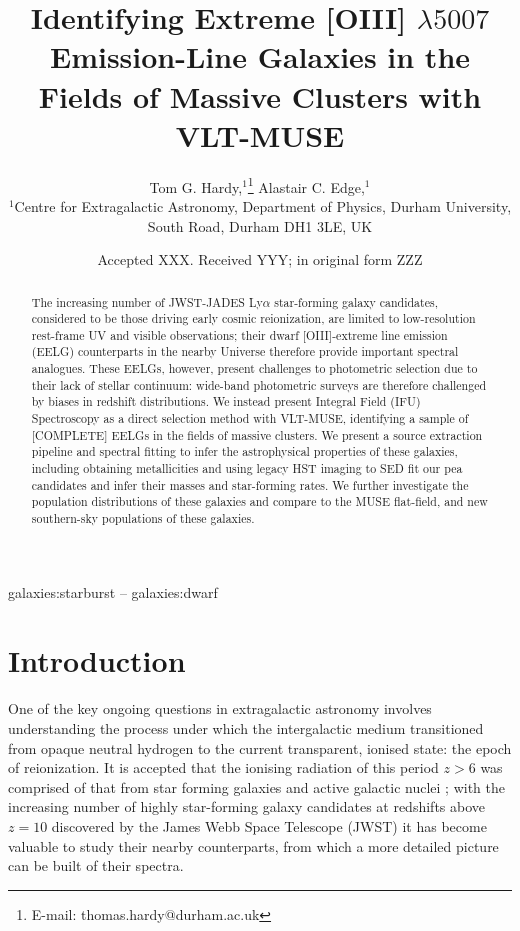 \documentclass[fleqn,usenatbib]{mnras}
\title[Finding EELGS with VLT-MUSE]{Identifying Extreme [OIII] $\lambda5007$ Emission-Line Galaxies in the Fields of Massive Clusters with VLT-MUSE }
\author[T. G. Hardy et. al.]{
Tom G. Hardy,$^{1}$\thanks{E-mail: thomas.hardy@durham.ac.uk}
Alastair C. Edge,$^{1}$
\\
$^{1}$Centre for Extragalactic Astronomy, Department of Physics, Durham University, South Road, Durham DH1 3LE, UK\\
}
\date{Accepted XXX. Received YYY; in original form ZZZ}
\begin{document}
\label{firstpage}
\pagerange{\pageref{firstpage}--\pageref{lastpage}}
\maketitle

\begin{abstract}
The increasing number of JWST-JADES Ly$\alpha$ star-forming galaxy candidates, considered to be those driving early cosmic reionization, are limited to low-resolution rest-frame UV and visible observations; their dwarf [OIII]-extreme line emission (EELG) counterparts in the nearby Universe therefore provide important spectral analogues. These EELGs, however, present challenges to photometric selection due to their lack of stellar continuum: wide-band photometric surveys are therefore challenged by biases in redshift distributions. We instead present Integral Field (IFU) Spectroscopy as a direct selection method with VLT-MUSE, identifying a sample of [COMPLETE] EELGs in the fields of massive clusters. We present a source extraction pipeline and spectral fitting to infer the astrophysical properties of these galaxies, including obtaining metallicities and using legacy HST imaging to SED fit our pea candidates and infer their masses and star-forming rates. We further investigate the population distributions of these galaxies and compare to the MUSE flat-field, and new southern-sky populations of these galaxies.
\end{abstract}

\begin{keywords}
galaxies:starburst -- galaxies:dwarf 
\end{keywords}



\section{Introduction}
One of the key ongoing questions in extragalactic astronomy involves understanding the process under which the intergalactic medium transitioned from opaque neutral hydrogen to the current transparent, ionised state: the epoch of reionization. It is accepted \citep{brunker_2020} that the ionising  radiation of this period $z>6$ was comprised of that from star forming galaxies \citep{robertson2020,tacchella_2025} and active galactic nuclei \citep{2004ApJ...604..484M, Madau2014}; with the increasing number of highly star-forming galaxy candidates at redshifts above $z=10$ discovered by the James Webb Space Telescope (JWST) \citep{Rhoads, hainline_2023} it has become valuable to study their nearby counterparts, from which a more detailed picture can be built of their spectra. 
\end{document}
